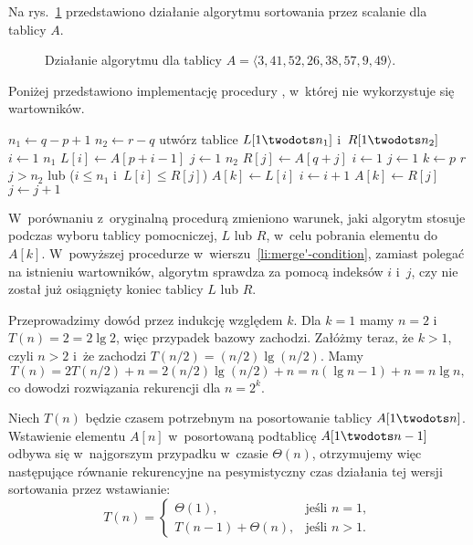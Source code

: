 
\exercise %
Na rys.\ \ref{fig:2.3-1} przedstawiono działanie algorytmu sortowania przez scalanie dla tablicy $A$.
\begin{figure}[!ht]
	\centering 
	\caption{Działanie algorytmu  dla tablicy $A=\langle3,41,52,26,38,57,9,49\rangle$.} \label{fig:2.3-1}
\end{figure}

\exercise %
Poniżej przedstawiono implementację procedury , w~której nie wykorzystuje się wartowników.
\begin{codebox}
\li	$n_1\gets q-p+1$
\li	$n_2\gets r-q$
\li	utwórz tablice $L[1\twodots n_1]$ i~$R[1\twodots n_2]$
\li	\For $i\gets1$ \To $n_1$
\li		\Do $L[i]\gets A[p+i-1]$
		\End
\li	\For $j\gets1$ \To $n_2$
\li		\Do $R[j]\gets A[q+j]$
		\End
\li	$i\gets1$
\li $j\gets1$
\li \For $k\gets p$ \To $r$
\li		\Do \If $j>n_2$ lub ($i\le n_1$ i~$L[i]\le R[j]$) \label{li:merge'-condition}
\li				\Then $A[k]\gets L[i]$
\li					$i\gets i+1$
\li				\Else $A[k]\gets R[j]$
\li					$j\gets j+1$
				\End
		\End
\end{codebox}
W~porównaniu z~oryginalną procedurą zmieniono warunek, jaki algorytm stosuje podczas wyboru tablicy pomocniczej, $L$ lub $R$, w~celu pobrania elementu do $A[k]$.
W~powyższej procedurze w~wierszu~\ref{li:merge'-condition}, zamiast polegać na istnieniu wartowników, algorytm sprawdza za pomocą indeksów $i$ i~$j$, czy nie został już osiągnięty koniec tablicy $L$ lub $R$.

\exercise %
Przeprowadzimy dowód przez indukcję względem $k$.
Dla $k=1$ mamy $n=2$ i~$T(n)=2=2\lg2$, więc przypadek bazowy zachodzi.
Załóżmy teraz, że $k>1$, czyli $n>2$ i~że zachodzi $T(n/2)=(n/2)\lg(n/2)$.
Mamy
\[
	T(n) = 2T(n/2)+n = 2(n/2)\lg(n/2)+n = n(\lg n-1)+n = n\lg n,
\]
co dowodzi rozwiązania rekurencji dla $n=2^k$.

\exercise %
Niech $T(n)$ będzie czasem potrzebnym na posortowanie tablicy $A[1\twodots n]$.
Wstawienie elementu $A[n]$ w~posortowaną podtablicę $A[1\twodots n-1]$ odbywa się w~najgorszym przypadku w~czasie $\Theta(n)$, otrzymujemy więc następujące równanie rekurencyjne na pesymistyczny czas działania tej wersji sortowania przez wstawianie:
\[
	T(n) =
	\begin{cases}
		\Theta(1), & \text{jeśli $n=1$}, \\
		T(n-1)+\Theta(n), & \text{jeśli $n>1$}.
	\end{cases}
\]


